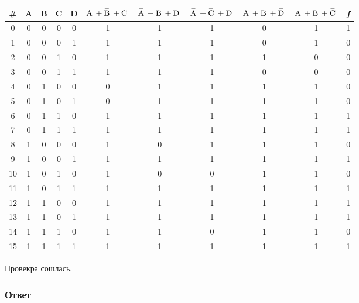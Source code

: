 \documentclass[a4paper, 14pt]{extarticle}
\begin{document}
\begin{table}[h!]
  \centering
  \setlength{\arrayrulewidth}{0.5mm}
  \setlength{\tabcolsep}{20pt}
  \renewcommand{\arraystretch}{1.5}
  \begin{adjustbox}{max width=1\textwidth}
    \begin{tabular}{|c|c|c|c|c|c|c|c|c|c|c|}
    \hline
    \rowcolor{gray!50}
    \# & \bfseries A & \bfseries B & \bfseries C & \bfseries D & 
    $\NOV{A} + \OV{B} + \NOV{C}$ & 
    $\OV{A} + \NOV{B} + \NOV{D}$ & 
    $\OV{A} + \OV{C} + \NOV{D}$ & 
    $\NOV{A} + \NOV{B} + \OV{D}$ & 
    $\NOV{A} + \NOV{B} + \OV{C}$ & 
    \bfseries \itshape f \\
    \hline
    0 & 0 & 0 & 0 & 0 &  1&1&1&0&1& 1 \\
    \hline
    1 & 0 & 0 & 0 & 1 &  1&1&1&0&1& 0 \\
    \hline
    2 & 0 & 0 & 1 & 0 &  1&1&1&1&0& 0 \\
    \hline
    3 & 0 & 0 & 1 & 1 &  1&1&1&0&0& 0 \\
    \hline
    4 & 0 & 1 & 0 & 0 &  0&1&1&1&1& 0 \\
    \hline
    5 & 0 & 1 & 0 & 1 &  0&1&1&1&1& 0 \\
    \hline
    6 & 0 & 1 & 1 & 0 &  1&1&1&1&1& 1 \\
    \hline
    7 & 0 & 1 & 1 & 1 &  1&1&1&1&1& 1 \\
    \hline
    8 & 1 & 0 & 0 & 0 &  1&0&1&1&1& 0 \\
    \hline
    9 & 1 & 0 & 0 & 1 &  1&1&1&1&1& 1 \\
    \hline
    10 & 1 & 0 & 1 & 0 & 1&0&0&1&1& 0 \\
    \hline
    11 & 1 & 0 & 1 & 1 & 1&1&1&1&1& 1 \\
    \hline
    12 & 1 & 1 & 0 & 0 & 1&1&1&1&1& 1 \\
    \hline
    13 & 1 & 1 & 0 & 1 & 1&1&1&1&1& 1 \\
    \hline
    14 & 1 & 1 & 1 & 0 & 1&1&0&1&1& 0 \\
    \hline
    15 & 1 & 1 & 1 & 1 & 1&1&1&1&1& 1 \\
    \hline
    \end{tabular}
  \end{adjustbox}
\end{table}

Провекра сошлась.

\subsubsection{Ответ}
\end{document}
